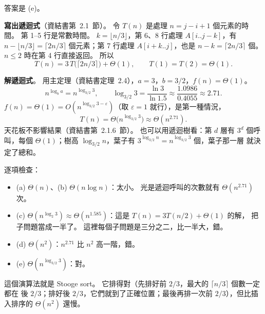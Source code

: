 \begin{pastsoln}
答案是 (e)。

\textbf{寫出遞迴式}（資結書第~2.1~節）。 令 $T(n)$ 是處理 $n = j - i + 1$ 個元素的時間。
第 1--5 行是常數時間。 $k = \lfloor n/3 \rfloor$，第 6、8 行處理 $A[i..j-k]$，有
$n - \lfloor n/3 \rfloor = \lceil 2n/3 \rceil$ 個元素；第 7 行處理 $A[i+k..j]$，也是
$n - k = \lceil 2n/3 \rceil$ 個。 $n \le 2$ 時在第 4 行直接返回。 所以
\[
T(n) = 3\,T\bigl(\lceil 2n/3 \rceil\bigr) + \Theta(1), \qquad T(1) = T(2) = \Theta(1).
\]

\textbf{解遞迴式}。 用主定理（資結書定理~2.4），$a = 3$，$b = 3/2$，$f(n) = \Theta(1)$。
\[
n^{\log_b a} = n^{\log_{3/2} 3}, \qquad \log_{3/2} 3 = \frac{\ln 3}{\ln 1.5} \approx \frac{1.0986}{0.4055}
\approx 2.71 .
\]
$f(n) = \Theta(1) = O(n^{\log_{3/2} 3 - \varepsilon})$（取 $\varepsilon = 1$ 就行），是第一種情況，
\[
T(n) = \Theta\bigl(n^{\log_{3/2} 3}\bigr) \approx \Theta(n^{2.71}).
\]
天花板不影響結果（資結書第~2.1.6~節）。 也可以用遞迴樹看：第 $d$ 層有 $3^d$ 個呼叫，每個
$\Theta(1)$；樹高 $\log_{3/2} n$，葉子有 $3^{\log_{3/2} n} = n^{\log_{3/2} 3}$ 個，葉子那一層
就決定了總和。

逐項檢查：
\begin{itemize}
\item (a) $\Theta(n)$、(b) $\Theta(n \log n)$：太小。 光是遞迴呼叫的次數就有 $\Theta(n^{2.71})$ 次。
\item (c) $\Theta(n^{\log_2 3}) \approx \Theta(n^{1.585})$：這是 $T(n) = 3T(n/2) + \Theta(1)$ 的解，
把子問題當成一半了。 這裡每個子問題是三分之二，比一半大，錯。
\item (d) $\Theta(n^2)$：$n^{2.71}$ 比 $n^2$ 高一階，錯。
\item (e) $\Theta(n^{\log_{3/2} 3})$：對。
\end{itemize}
這個演算法就是 Stooge sort。 它排得對（先排好前 $2/3$，最大的 $\lceil n/3 \rceil$ 個數一定都在
後 $2/3$；排好後 $2/3$，它們就到了正確位置；最後再排一次前 $2/3$），但比插入排序的
$\Theta(n^2)$ 還慢。
\end{pastsoln}
